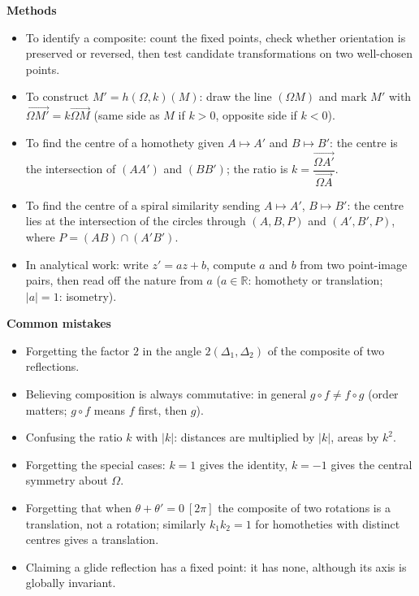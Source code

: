 \documentclass[11pt]{article}
\begin{document}
\begin{bilan}
\textbf{Methods}\par
\begin{itemize}
\item To identify a composite: count the fixed points, check whether orientation is preserved or reversed, then test candidate transformations on two well-chosen points.
\item To construct $M'=h(\Omega,k)(M)$: draw the line $(\Omega M)$ and mark $M'$ with $\overrightarrow{\Omega M'}=k\overrightarrow{\Omega M}$ (same side as $M$ if $k>0$, opposite side if $k<0$).
\item To find the centre of a homothety given $A\mapsto A'$ and $B\mapsto B'$: the centre is the intersection of $(AA')$ and $(BB')$; the ratio is $k=\dfrac{\overrightarrow{\Omega A'}}{\overrightarrow{\Omega A}}$.
\item To find the centre of a spiral similarity sending $A\mapsto A'$, $B\mapsto B'$: the centre lies at the intersection of the circles through $(A,B,P)$ and $(A',B',P)$, where $P=(AB)\cap(A'B')$.
\item In analytical work: write $z'=az+b$, compute $a$ and $b$ from two point-image pairs, then read off the nature from $a$ ($a\in\mathbb{R}$: homothety or translation; $|a|=1$: isometry).
\end{itemize}

\textbf{Common mistakes}\par
\begin{itemize}
\item Forgetting the factor $2$ in the angle $2(\Delta_1,\Delta_2)$ of the composite of two reflections.
\item Believing composition is always commutative: in general $g\circ f\neq f\circ g$ (order matters; $g\circ f$ means $f$ first, then $g$).
\item Confusing the ratio $k$ with $|k|$: distances are multiplied by $|k|$, areas by $k^2$.
\item Forgetting the special cases: $k=1$ gives the identity, $k=-1$ gives the central symmetry about $\Omega$.
\item Forgetting that when $\theta+\theta'=0\ [2\pi]$ the composite of two rotations is a translation, not a rotation; similarly $k_1k_2=1$ for homotheties with distinct centres gives a translation.
\item Claiming a glide reflection has a fixed point: it has none, although its axis is globally invariant.
\end{itemize}


\end{bilan}
\end{document}
